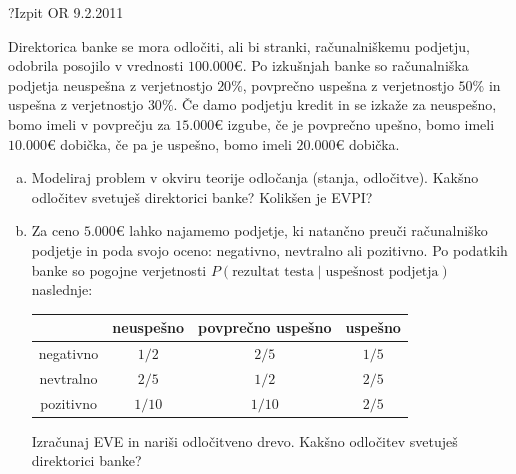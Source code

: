 \begin{naloga}{?}{Izpit OR 9.2.2011}
\begin{vprasanje}[direktorica]
Direktorica banke se mora odločiti, ali bi stranki, računalniškemu podjetju,
odobrila posojilo v vrednosti $100.000 €$.
Po izkušnjah banke so računalniška podjetja neuspešna z verjetnostjo $20 \%$,
povprečno uspešna z verjetnostjo $50 \%$ in uspešna z verjetnostjo $30 \%$.
Če damo podjetju kredit in se izkaže za neuspešno,
bomo imeli v povprečju za $15.000 €$ izgube,
če je povprečno upešno, bomo imeli $10.000 €$ dobička,
če pa je uspešno, bomo imeli $20.000 €$ dobička.
\begin{enumerate}[(a)]
\item Modeliraj problem v okviru teorije odločanja (stanja, odločitve).
Kakšno odločitev svetuješ direktorici banke?
Kolikšen je EVPI?

\item Za ceno $5.000 €$ lahko najamemo podjetje,
ki natančno preuči računalniško podjetje in poda svojo oceno:
negativno, nevtralno ali pozitivno.
Po podatkih banke so pogojne verjetnosti
$P(\text{rezultat testa} \;|\; \text{uspešnost podjetja})$ naslednje:
\begin{center}
\begin{tabular}{c|ccc}
& neuspešno & povprečno uspešno & uspešno \\ \hline
negativno & $1/2$  & $2/5$  & $1/5$ \\
nevtralno & $2/5$  & $1/2$  & $2/5$ \\
pozitivno & $1/10$ & $1/10$ & $2/5$
\end{tabular}
\end{center}
Izračunaj EVE in nariši odločitveno drevo.
Kakšno odločitev svetuješ direktorici banke?
\end{enumerate}
\end{vprasanje}
\begin{odgovor}
\end{odgovor}
\end{naloga}


